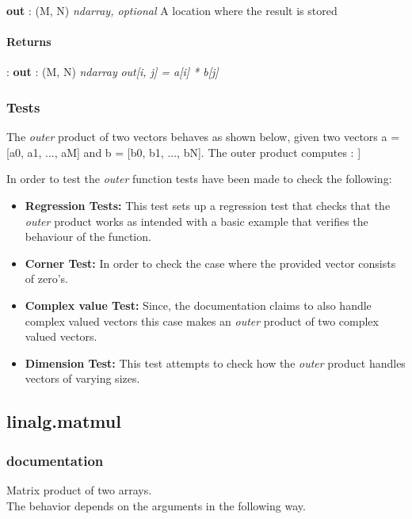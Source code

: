 \documentclass[a4paper,11pt]{article}
\begin{document}
\textbf{out} : (M, N) \textit{ndarray, optional} A location where the result is stored

\paragraph{Returns}: \textbf{out} : (M, N) \textit{ndarray} \textit{out[i, j] = a[i] * b[j]}


\subsubsection{Tests}

The \emph{outer} product of two vectors behaves as shown below, given two vectors a = [a0, a1, ..., aM] and b = [b0, b1, ..., bN]. The outer product computes :
\newline [[a0*b0 a0*bN... a0*bN]
[a1*b0 ... ] \newline
[~.~~~~~~~~~~~~~~~~~~~~~~~~~~~~~~~~~~~~~~~~~~      ] \newline
[aM*b0...~~~~~~~~~~~~~~~~~~~~~~ aM*bN]] \newline

In order to test the \textit{outer} function tests have been made to check the following:

\begin{itemize}
	\item \textbf{Regression Tests:}  This test sets up a regression test that checks that the \emph{outer} product works as intended with a basic example that verifies the behaviour of the function. 
	\item \textbf{Corner Test:} In order to check the case where the provided vector consists of zero's.
	\item \textbf{Complex value Test: } Since, the documentation claims to also handle complex valued vectors this case makes an \emph{outer} product of two complex valued vectors.
	\item \textbf{Dimension Test:} This test attempts to check how the \emph{outer} product handles vectors of varying sizes.
\end{itemize}

\subsection{linalg.matmul}
\subsubsection{documentation}
Matrix product of two arrays.\\ The behavior depends on the arguments in the following way.\\
\end{document}
